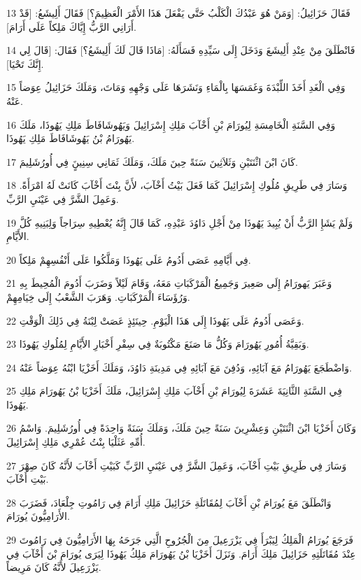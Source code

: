 \par 13 فَقَالَ حَزَائِيلُ: [وَمَنْ هُوَ عَبْدُكَ الْكَلْبُ حَتَّى يَفْعَلَ هَذَا الأَمْرَ الْعَظِيمَ؟] فَقَالَ أَلِيشَعُ: [قَدْ أَرَانِي الرَّبُّ إِيَّاكَ مَلِكاً عَلَى أَرَامَ].
\par 14 فَانْطَلَقَ مِنْ عِنْدِ أَلِيشَعَ وَدَخَلَ إِلَى سَيِّدِهِ فَسَأَلَهُ: [مَاذَا قَالَ لَكَ أَلِيشَعُ؟] فَقَالَ: [قَالَ لِي إِنَّكَ تَحْيَا].
\par 15 وَفِي الْغَدِ أَخَذَ اللِّبْدَةَ وَغَمَسَهَا بِالْمَاءِ وَنَشَرَهَا عَلَى وَجْهِهِ وَمَاتَ، وَمَلَكَ حَزَائِيلُ عِوَضاً عَنْهُ.
\par 16 وَفِي السَّنَةِ الْخَامِسَةِ لِيُورَامَ بْنِ أَخْآبَ مَلِكِ إِسْرَائِيلَ وَيَهُوشَافَاطَ مَلِكِ يَهُوذَا، مَلَكَ يَهُورَامُ بْنُ يَهُوشَافَاطَ مَلِكِ يَهُوذَا.
\par 17 كَانَ ابْنَ اثْنَتَيْنِ وَثَلاَثِينَ سَنَةً حِينَ مَلَكَ، وَمَلَكَ ثَمَانِي سِنِينٍَ فِي أُورُشَلِيمَ.
\par 18 وَسَارَ فِي طَرِيقِ مُلُوكِ إِسْرَائِيلَ كَمَا فَعَلَ بَيْتُ أَخْآبَ، لأَنَّ بِنْتَ أَخْآبَ كَانَتْ لَهُ امْرَأَةً. وَعَمِلَ الشَّرَّ فِي عَيْنَيِ الرَّبِّ.
\par 19 وَلَمْ يَشَإِ الرَّبُّ أَنْ يُبِيدَ يَهُوذَا مِنْ أَجْلِ دَاوُدَ عَبْدِهِ، كَمَا قَالَ إِنَّهُ يُعْطِيهِ سِرَاجاً وَلِبَنِيهِ كُلَّ الأَيَّامِ.
\par 20 فِي أَيَّامِهِ عَصَى أَدُومُ عَلَى يَهُوذَا وَمَلَّكُوا عَلَى أَنْفُسِهِمْ مَلِكاً.
\par 21 وَعَبَرَ يَهورَامُ إِلَى صَعِيرَ وَجَمِيعُ الْمَرْكَبَاتِ مَعَهُ، وَقَامَ لَيْلاً وَضَرَبَ أَدُومَ الْمُحِيطَ بِهِ وَرُؤَسَاءَ الْمَرْكَبَاتِ. وَهَرَبَ الشَّعْبُ إِلَى خِيَامِهِمْ.
\par 22 وَعَصَى أَدُومُ عَلَى يَهُوذَا إِلَى هَذَا الْيَوْمِ. حِينَئِذٍ عَصَتْ لِبْنَةُ فِي ذَلِكَ الْوَقْتِ.
\par 23 وَبَقِيَّةُ أُمُورِ يَهُورَامَ وَكُلُّ مَا صَنَعَ مَكْتُوبَةٌ فِي سِفْرِ أَخْبَارِ الأَيَّامِ لِمُلُوكِ يَهُوذَا.
\par 24 وَاضْطَجَعَ يَهُورَامُ مَعَ آبَائِهِ، وَدُفِنَ مَعَ آبَائِهِ فِي مَدِينَةِ دَاوُدَ، وَمَلَكَ أَخَزْيَا ابْنُهُ عِوَضاً عَنْهُ.
\par 25 فِي السَّنَةِ الثَّانِيَةَ عَشَرَةَ لِيُورَامَ بْنِ أَخْآبَ مَلِكِ إِسْرَائِيلَ، مَلَكَ أَخَزْيَا بْنُ يَهُورَامَ مَلِكِ يَهُوذَا.
\par 26 وَكَانَ أَخَزْيَا ابْنَ اثْنَتَيْنِ وَعِشْرِينَ سَنَةً حِينَ مَلَكَ، وَمَلَكَ سَنَةً وَاحِدَةً فِي أُورُشَلِيمَ. وَاسْمُ أُمِّهِ عَثَلْيَا بِنْتُ عُمْرِي مَلِكِ إِسْرَائِيلَ.
\par 27 وَسَارَ فِي طَرِيقِ بَيْتِ أَخْآبَ، وَعَمِلَ الشَّرَّ فِي عَيْنَيِ الرَّبِّ كَبَيْتِ أَخْآبَ لأَنَّهُ كَانَ صِهْرَ بَيْتِ أَخْآبَ.
\par 28 وَانْطَلَقَ مَعَ يُورَامَ بْنِ أَخْآبَ لِمُقَاتَلَةِ حَزَائِيلَ مَلِكِ أَرَامَ فِي رَامُوتِ جِلْعَادَ، فَضَرَبَ الأَرَامِيُّونَ يُورَامَ.
\par 29 فَرَجَعَ يُورَامُ الْمَلِكُ لِيَبْرَأَ فِي يَزْرَعِيلَ مِنَ الْجُرُوحِ الَّتِي جَرَحَهُ بِهَا الأَرَامِيُّونَ فِي رَامُوتَ عِنْدَ مُقَاتَلَتِهِ حَزَائِيلَ مَلِكَ أَرَامَ. وَنَزَلَ أَخَزْيَا بْنُ يَهُورَامَ مَلِكُ يَهُوذَا لِيَرَى يُورَامَ بْنَ أَخْآبَ فِي يَزْرَعِيلَ لأَنَّهُ كَانَ مَرِيضاً.

